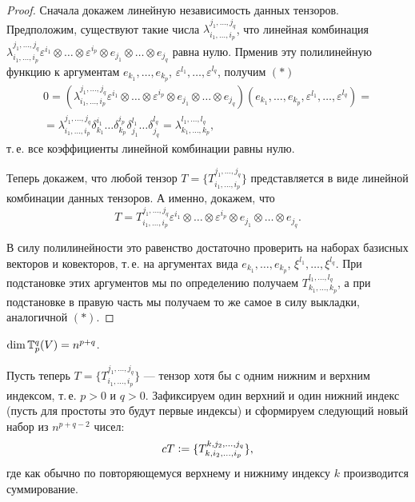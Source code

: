 \begin{proof}
    Сначала докажем линейную независимость данных тензоров. Предположим, существуют такие числа $\lambda_{i_1, \ldots, i_p}^{j_1, \ldots, j_q}$, что линейная комбинация $\lambda_{i_1, \ldots, i_p}^{j_1, \ldots, j_q}\varepsilon^{i_1} \otimes \ldots \otimes \varepsilon^{i_p} \otimes e_{j_1} \otimes \ldots \otimes e_{j_q}$ равна нулю. Прменив эту полилинейную функцию к аргументам $e_{k_1}, \ldots, e_{k_p}$, $\varepsilon^{l_1}, \ldots, \varepsilon^{l_q}$, получим $(\ast)$
    \begin{multline*}
        0 = (\lambda_{i_1, \ldots, i_p}^{j_1, \ldots, j_q}\varepsilon^{i_1} \otimes \ldots \otimes \varepsilon^{i_p} \otimes e_{j_1} \otimes \ldots \otimes e_{j_q})(e_{k_1}, \ldots, e_{k_p}, \varepsilon^{l_1}, \ldots, \varepsilon^{l_q}) =\\ = \lambda_{i_1, \ldots, i_p}^{j_1, \ldots, j_q}\delta_{k_1}^{i_1}\ldots\delta_{k_p}^{i_p}\delta_{j_1}^{l_1}\ldots\delta_{j_q}^{l_q} = \lambda_{k_1, \ldots, k_p}^{l_1, \ldots, l_q},
    \end{multline*}
    т.\,е. все коэффициенты линейной комбинации равны нулю.

    Теперь докажем, что любой тензор $T = \{T_{i_1, \ldots, i_p}^{j_1, \ldots, j_q}\}$ представляется в виде линейной комбинации данных тензоров. А именно, докажем, что
    \[
        T = T_{i_1, \ldots, i_p}^{j_1, \ldots, j_q}\varepsilon^{i_1} \otimes \ldots \otimes \varepsilon^{i_p} \otimes e_{j_1} \otimes \ldots \otimes e_{j_q}.
    \]

    В силу полилинейности это равенство достаточно проверить на наборах базисных векторов и ковекторов, т.\,е. на аргументах вида $e_{k_1}, \ldots, e_{k_p}$, $\xi^{l_1}, \ldots, \xi^{l_q}$. При подстановке этих аргументов мы по определению получаем $T_{k_1, \ldots, k_p}^{l_1, \ldots, l_q}$, а при подстановке в правую часть мы получаем то же самое в силу выкладки, аналогичной $(\ast)$.
\end{proof}

\begin{corollary}
    $\dim\mathbb{T}_p^q(V) = n^{p + q}$.
\end{corollary}

Пусть теперь $T = \{T_{i_1, \ldots, i_p}^{j_1, \ldots, j_q}\}$ --- тензор хотя бы с одним нижним и верхним индексом, т.\,е. $p > 0$ и $q > 0$. Зафиксируем один верхний и один нижний индекс (пусть для простоты это будут первые индексы) и сформируем следующий новый набор из $n^{p + q - 2}$ чисел:
\[
    cT \vcentcolon = \{T_{k, i_2, \ldots, i_p}^{k, j_2, \ldots, j_q}\},
\]
где как обычно по повторяющемуся верхнему и нижниму индексу $k$ производится суммирование. 

